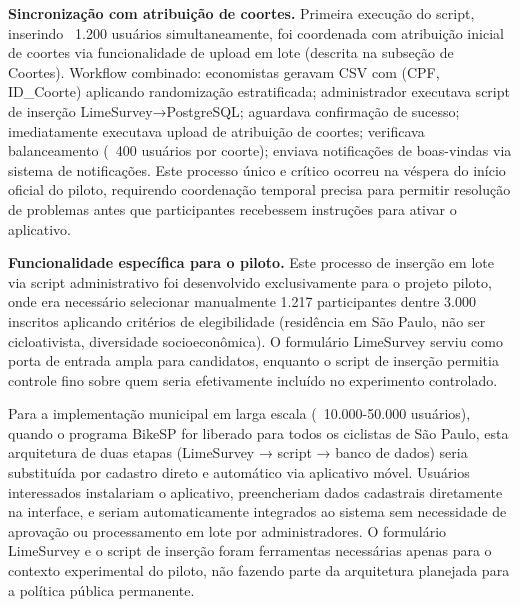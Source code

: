 \textbf{Sincronização com atribuição de coortes.} Primeira execução do script, inserindo ~1.200 usuários simultaneamente, foi coordenada com atribuição inicial de coortes via funcionalidade de upload em lote (descrita na subseção de Coortes). Workflow combinado: economistas geravam CSV com (CPF, ID\_Coorte) aplicando randomização estratificada; administrador executava script de inserção LimeSurvey→PostgreSQL; aguardava confirmação de sucesso; imediatamente executava upload de atribuição de coortes; verificava balanceamento (~400 usuários por coorte); enviava notificações de boas-vindas via sistema de notificações. Este processo único e crítico ocorreu na véspera do início oficial do piloto, requirendo coordenação temporal precisa para permitir resolução de problemas antes que participantes recebessem instruções para ativar o aplicativo.

\textbf{Funcionalidade específica para o piloto.} Este processo de inserção em lote via script administrativo foi desenvolvido exclusivamente para o projeto piloto, onde era necessário selecionar manualmente 1.217 participantes dentre 3.000 inscritos aplicando critérios de elegibilidade (residência em São Paulo, não ser cicloativista, diversidade socioeconômica). O formulário LimeSurvey serviu como porta de entrada ampla para candidatos, enquanto o script de inserção permitia controle fino sobre quem seria efetivamente incluído no experimento controlado.

Para a implementação municipal em larga escala (~10.000-50.000 usuários), quando o programa BikeSP for liberado para todos os ciclistas de São Paulo, esta arquitetura de duas etapas (LimeSurvey → script → banco de dados) seria substituída por cadastro direto e automático via aplicativo móvel. Usuários interessados instalariam o aplicativo, preencheriam dados cadastrais diretamente na interface, e seriam automaticamente integrados ao sistema sem necessidade de aprovação ou processamento em lote por administradores. O formulário LimeSurvey e o script de inserção foram ferramentas necessárias apenas para o contexto experimental do piloto, não fazendo parte da arquitetura planejada para a política pública permanente.


